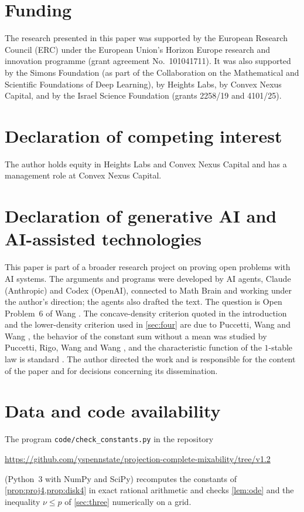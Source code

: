 \documentclass[11pt]{article}
\theoremstyle{definition}
\theoremstyle{remark}
\begin{document}
\section*{Funding}

The research presented in this paper was supported by the European Research Council (ERC) under the European
Union's Horizon Europe research and innovation programme (grant agreement No.\ 101041711). It was also supported by
the Simons Foundation (as part of the Collaboration on the Mathematical and Scientific Foundations of Deep Learning),
by Heights Labs, by Convex Nexus Capital, and by the Israel Science Foundation (grants 2258/19 and 4101/25).

\section*{Declaration of competing interest}

The author holds equity in Heights Labs and Convex Nexus Capital and has a management role at Convex Nexus Capital.

\section*{Declaration of generative AI and AI-assisted technologies}

This paper is part of a broader research project on proving open problems with AI systems. The arguments and programs were developed by AI agents, Claude (Anthropic) and Codex (OpenAI), connected to Math Brain
and working under the author's direction; the agents also drafted the text. The question is Open Problem~6 of Wang
\cite{Wang}. The concave-density criterion quoted in the introduction and the lower-density criterion used in
\cref{sec:four} are due to Puccetti, Wang and Wang \cite{PWW12,PWW13}, the behavior of the constant sum without a
mean was studied by Puccetti, Rigo, Wang and Wang \cite{PRWW}, and
the characteristic function of the $1$-stable law is standard \cite{ST}. The author directed the work and is
responsible for the content of the paper and for decisions concerning its dissemination.

\section*{Data and code availability}

The program \texttt{code/check\_constants.py} in the repository
\begin{center}\url{https://github.com/yspennstate/projection-complete-mixability/tree/v1.2}\end{center}
(Python~3 with NumPy and SciPy) recomputes the constants of \cref{prop:proj4,prop:disk4} in exact rational arithmetic and checks
\cref{lem:ode} and the inequality $\nu\le p$ of \cref{sec:three} numerically on a grid.
\end{document}
